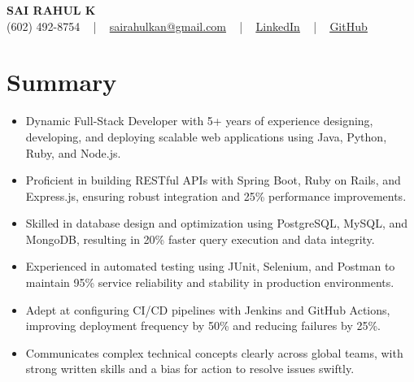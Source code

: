 \documentclass[letterpaper,11pt]{article}
\newcommand{\resumeItem}[1]{
  \item\footnotesize{
    {#1 \vspace{-2pt}}
  }
}
\newcommand{\resumeItemListStart}{\begin{itemize}[leftmargin=*]}
\newcommand{\resumeItemListEnd}{\end{itemize}\vspace{-5pt}}
\begin{document}
\begin{center}
    {\fontsize{14pt}{12pt}\selectfont \textbf{\MakeUppercase{Sai Rahul K}}}\\ \vspace{2pt}
    \fontsize{10pt}{12pt}\selectfont (602) 492-8754 ~ | ~ \href{mailto:sairahulkan@gmail.com}{sairahulkan@gmail.com} ~ | ~
    \href{https://www.linkedin.com/in/rq123/}{\color{blue}\underline{LinkedIn}} ~ | ~
    \href{https://github.com/kanrahuldo}{\color{blue}\underline{GitHub}}~
    \vspace{-8pt}
\end{center}

\section{Summary}
\fontsize{9pt}{10pt}\selectfont
\resumeItemListStart
    \resumeItem{Dynamic Full-Stack Developer with 5+ years of experience designing, developing, and deploying scalable web applications using Java, Python, Ruby, and Node.js.}
    \resumeItem{Proficient in building RESTful APIs with Spring Boot, Ruby on Rails, and Express.js, ensuring robust integration and 25\% performance improvements.}
    \resumeItem{Skilled in database design and optimization using PostgreSQL, MySQL, and MongoDB, resulting in 20\% faster query execution and data integrity.}
    \resumeItem{Experienced in automated testing using JUnit, Selenium, and Postman to maintain 95\% service reliability and stability in production environments.}
    \resumeItem{Adept at configuring CI/CD pipelines with Jenkins and GitHub Actions, improving deployment frequency by 50\% and reducing failures by 25\%.}
    \resumeItem{Communicates complex technical concepts clearly across global teams, with strong written skills and a bias for action to resolve issues swiftly.}
\resumeItemListEnd
\vspace{-6pt}
\end{document}
